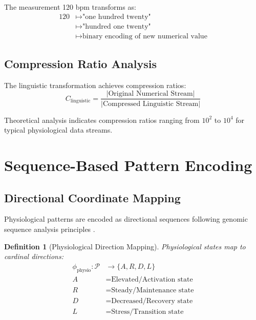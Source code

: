 \documentclass[12pt,a4paper]{article}
\newtheorem{definition}{Definition}
\begin{document}
\begin{example}
The measurement 120 bpm transforms as:
\begin{align}
120 &\mapsto \text{"one hundred twenty"} \\
&\mapsto \text{"hundred one twenty"} \\
&\mapsto \text{binary encoding of new numerical value}
\end{align}
\end{example}

\subsection{Compression Ratio Analysis}

The linguistic transformation achieves compression ratios:
\begin{equation}
C_{\text{linguistic}} = \frac{|\text{Original Numerical Stream}|}{|\text{Compressed Linguistic Stream}|}
\end{equation}

Theoretical analysis indicates compression ratios ranging from $10^2$ to $10^4$ for typical physiological data streams.

\section{Sequence-Based Pattern Encoding}

\subsection{Directional Coordinate Mapping}

Physiological patterns are encoded as directional sequences following genomic sequence analysis principles \cite{watson1953molecular,cover2006elements}.

\begin{definition}[Physiological Direction Mapping]
Physiological states map to cardinal directions:
\begin{align}
\phi_{\text{physio}}: \mathcal{P} &\to \{A, R, D, L\} \\
A &= \text{Elevated/Activation state} \\
R &= \text{Steady/Maintenance state} \\
D &= \text{Decreased/Recovery state} \\
L &= \text{Stress/Transition state}
\end{align}
\end{definition}
\end{document}
